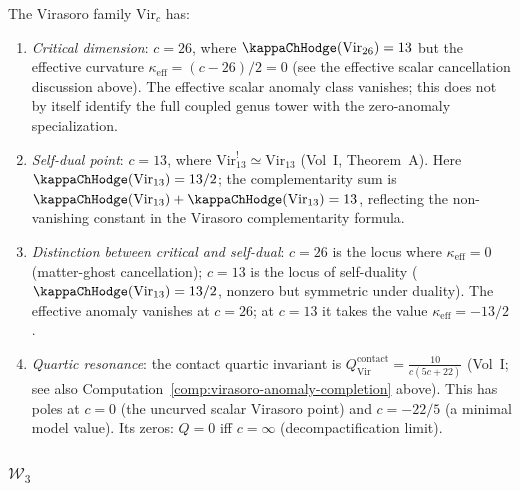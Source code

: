 \begin{computation}
The Virasoro family $\mathrm{Vir}_c$ has:
\begin{enumerate}[label=\textup{(\roman*)}]
\item \emph{Critical dimension}: $c = 26$, where
 $\kappaChHodge(\mathrm{Vir}_{26}) = 13$ but the effective curvature
 $\kappa_{\mathrm{eff}} = (c-26)/2 = 0$
 (see the effective scalar cancellation discussion above).
 The effective scalar anomaly class vanishes; this does not by itself
 identify the full coupled genus tower with the zero-anomaly
 specialization.
\item \emph{Self-dual point}: $c = 13$, where
 $\mathrm{Vir}_{13}^! \simeq \mathrm{Vir}_{13}$
 (Vol~I, Theorem~A).
 Here $\kappaChHodge(\mathrm{Vir}_{13}) = 13/2$; the complementarity
 sum is $\kappaChHodge(\mathrm{Vir}_{13}) + \kappaChHodge(\mathrm{Vir}_{13})
 = 13$, reflecting the non-vanishing constant
 in the Virasoro complementarity formula.
\item \emph{Distinction between critical and self-dual}:
 $c = 26$ is the locus where
 $\kappa_{\mathrm{eff}} = 0$ (matter-ghost cancellation);
 $c = 13$ is the locus of self-duality
 ($\kappaChHodge(\mathrm{Vir}_{13}) = 13/2$, nonzero but
 symmetric under duality).
 The effective anomaly vanishes at $c = 26$; at $c = 13$
 it takes the value $\kappa_{\mathrm{eff}} = -13/2$.
\item \emph{Quartic resonance}: the contact quartic invariant is
 $Q_{\mathrm{Vir}}^{\mathrm{contact}}
 = \frac{10}{c(5c + 22)}$
 (Vol~I; see also
 Computation~\ref{comp:virasoro-anomaly-completion} above).
 This has poles at $c = 0$ (the uncurved scalar Virasoro point) and
 $c = -22/5$ (a minimal model value).
 Its zeros: $Q = 0$ iff $c = \infty$ (decompactification limit).
\end{enumerate}
\end{computation}

\subsubsection{$\mathcal{W}_3$}

